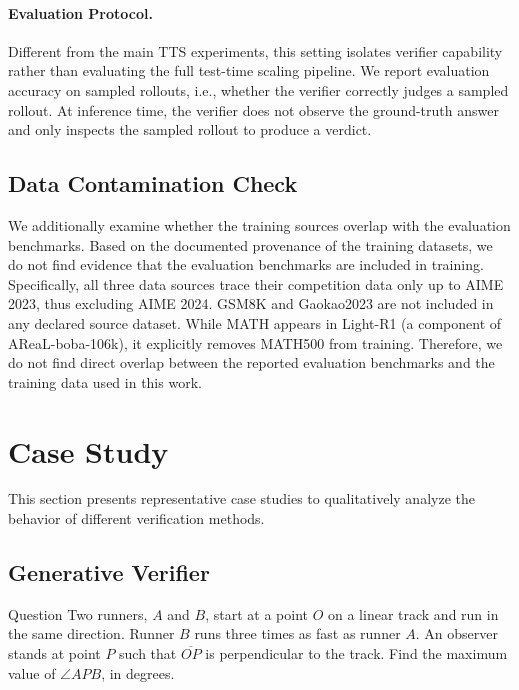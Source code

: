\documentclass[11pt]{article}
\begin{document}
\paragraph{Evaluation Protocol.}
Different from the main TTS experiments, this setting isolates verifier capability rather than evaluating the full test-time scaling pipeline.
We report evaluation accuracy on sampled rollouts, i.e., whether the verifier correctly judges a sampled rollout.
At inference time, the verifier does not observe the ground-truth answer and only inspects the sampled rollout to produce a verdict.

\subsection{Data Contamination Check}
We additionally examine whether the training sources overlap with the evaluation benchmarks. Based on the documented provenance of the training datasets, we do not find evidence that the evaluation benchmarks are included in training. Specifically, all three data sources trace their competition data only up to AIME 2023, thus excluding AIME 2024. GSM8K and Gaokao2023 are not included in any declared source dataset. While MATH appears in Light-R1 (a component of AReaL-boba-106k), it explicitly removes MATH500 from training. Therefore, we do not find direct overlap between the reported evaluation benchmarks and the training data used in this work.

\section{Case Study}
\label{sec:appendix_case}

This section presents representative case studies to qualitatively analyze
the behavior of different verification methods.

\subsection{Generative Verifier}

\begin{exbox}{Question}
Two runners, $A$ and $B$, start at a point $O$ on a linear track and run in the same direction.
Runner $B$ runs three times as fast as runner $A$.
An observer stands at point $P$ such that $\overline{OP}$ is perpendicular to the track.
Find the maximum value of $\angle APB$, in degrees.
\end{exbox}
\end{document}
